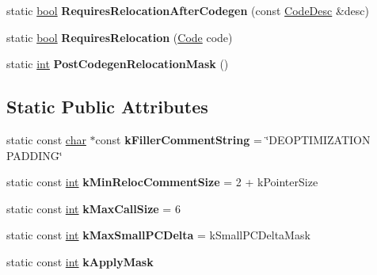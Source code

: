 \begin{DoxyCompactItemize}
static \mbox{\hyperlink{classbool}{bool}} {\bfseries Requires\+Relocation\+After\+Codegen} (const \mbox{\hyperlink{structv8_1_1internal_1_1CodeDesc}{Code\+Desc}} \&desc)
\item 
\mbox{\label{classv8_1_1internal_1_1RelocInfo_ae3e0ef20322b6db3eb4f272f0b6c6959}} 
static \mbox{\hyperlink{classbool}{bool}} {\bfseries Requires\+Relocation} (\mbox{\hyperlink{classv8_1_1internal_1_1Code}{Code}} code)
\item 
\mbox{\label{classv8_1_1internal_1_1RelocInfo_a6f49064ba286a16a94d4292f778aa1b7}} 
static \mbox{\hyperlink{classint}{int}} {\bfseries Post\+Codegen\+Relocation\+Mask} ()
\end{DoxyCompactItemize}
\subsection*{Static Public Attributes}
\begin{DoxyCompactItemize}
\item 
\mbox{\label{classv8_1_1internal_1_1RelocInfo_a5dca3a70ad12924b3a1d6a42c3b03a98}} 
static const \mbox{\hyperlink{classchar}{char}} $\ast$const {\bfseries k\+Filler\+Comment\+String} = \char`\"{}D\+E\+O\+P\+T\+I\+M\+I\+Z\+A\+T\+I\+ON P\+A\+D\+D\+I\+NG\char`\"{}
\item 
\mbox{\label{classv8_1_1internal_1_1RelocInfo_ac4fb63784119fabde3751f74a4c6317c}} 
static const \mbox{\hyperlink{classint}{int}} {\bfseries k\+Min\+Reloc\+Comment\+Size} = 2 + k\+Pointer\+Size
\item 
\mbox{\label{classv8_1_1internal_1_1RelocInfo_a67b0b843b7077292ca5e49d94470c54b}} 
static const \mbox{\hyperlink{classint}{int}} {\bfseries k\+Max\+Call\+Size} = 6
\item 
\mbox{\label{classv8_1_1internal_1_1RelocInfo_aaa24612c6d9accc00a457efc88180136}} 
static const \mbox{\hyperlink{classint}{int}} {\bfseries k\+Max\+Small\+P\+C\+Delta} = k\+Small\+P\+C\+Delta\+Mask
\item 
\mbox{\label{classv8_1_1internal_1_1RelocInfo_a3674f1738fbd7b36d670397d0fbd363e}} 
static const \mbox{\hyperlink{classint}{int}} {\bfseries k\+Apply\+Mask}
\end{DoxyCompactItemize}
